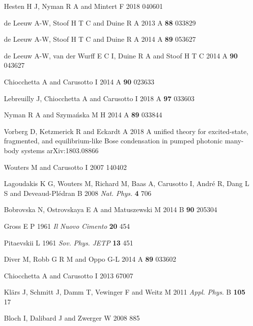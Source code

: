 \documentclass[12pt, a4paper]{iopart}
\begin{document}
\begin{thebibliography}{84}
Hesten H J, Nyman R A and Mintert F 2018  040601

de Leeuw A-W, Stoof H T C and Duine R A 2013 \PR A {\bf 88} 033829

de Leeuw A-W, Stoof H T C and Duine R A 2014 \PR A {\bf 89} 053627

de Leeuw A-W, van der Wurff E C I, Duine R A and Stoof H T C 2014 \PR A {\bf 90} 043627

Chiocchetta A and Carusotto I 2014 \PR A {\bf 90} 023633

Lebreuilly J, Chiocchetta A and Carusotto I 2018 \PR A {\bf 97} 033603

Nyman R A and Szyma{\'n}ska M H 2014 \PR A {\bf 89} 033844

Vorberg D, Ketzmerick R and Eckardt A 2018 A unified theory for excited-state, fragmented, and equilibrium-like Bose condensation in pumped photonic many-body systems arXiv:1803.08866

Wouters M and Carusotto I 2007  140402

Lagoudakis K G, Wouters M, Richard M, Baas A, Carusotto I, Andr{\'e} R, Dang L S and Deveaud-Pl{\'e}dran B 2008 {\it Nat. Phys.} {\bf 4} 706

Bobrovska N, Ostrovskaya E A and Matuszewski M 2014 \PR B {\bf 90} 205304

Gross E P 1961 {\it Il Nuovo Cimento} {\bf 20} 454

Pitaevskii L 1961 {\it Sov. Phys. JETP} {\bf 13} 451

Diver M, Robb G R M and Oppo G-L 2014 \PR A {\bf 89} 033602

Chiocchetta A and Carusotto I 2013  67007

Kl\"ars J, Schmitt J, Damm T, Vewinger F and Weitz M 2011 {\it Appl. Phys.} B {\bf 105} 17

Bloch I, Dalibard J and Zwerger W 2008  885


\end{thebibliography}
\end{document}
